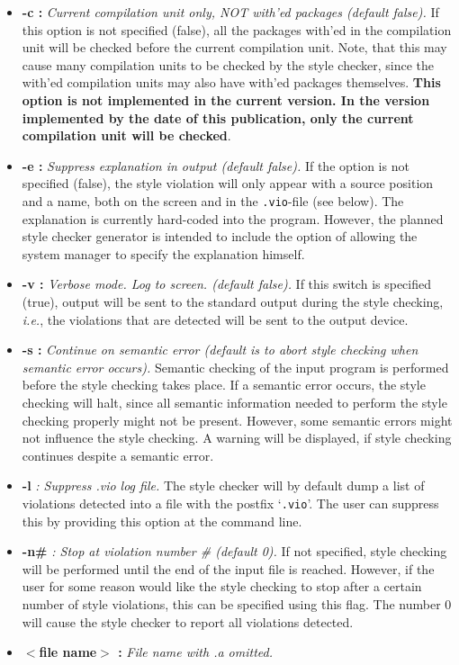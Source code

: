 \begin{itemize}
\item[] {\bf -c :} {\it Current compilation unit only, NOT with'ed packages (default
false).} If this option is not specified (false), all the packages with'ed in the
compilation unit will be checked before the current compilation unit. Note, that
this may cause many compilation units to be checked by the style checker, since the with'ed 
compilation units may also have with'ed packages themselves.
 {\bf This option is not 
implemented in the current version. In the version implemented by the date
of this publication, only the current
compilation unit will be checked}.
\item[] {\bf -e :} {\it Suppress explanation in output (default false).} 
If the option is not specified (false), the style violation will only
appear with a source position and a name, both on the screen and in the 
{\tt .vio}-file (see below). The explanation is currently hard-coded into the
program. However, the planned style checker generator is intended to include 
the option of allowing the system manager to specify the explanation himself.
\item[] {\bf -v :} {\it Verbose mode. Log to screen. (default false).} If this 
switch is specified (true), output will be sent to the standard output during the style
checking, {\em i.e.}, the violations that are detected will be sent to the output device. 
\item[] {\bf -s :} {\it Continue on semantic error (default is to abort style
checking when semantic error occurs).} Semantic checking
of the input program is performed before the style checking takes place. If a
semantic error occurs, the style checking will halt, since all semantic 
information needed to perform the style checking properly might not be present.
However, some semantic errors might not influence the style checking. A warning will be
displayed, if style checking continues despite a semantic error.
\item[] {\bf -l} {\it : Suppress .vio log file.} The style checker will
by default dump a list of violations detected into a file with the postfix `{\tt .vio}'. The user can suppress this by providing this option at the command line.
\item[] {\bf -n\#} {\it  : Stop at violation number \# (default 0).} If not specified, 
style checking will be performed until the end of the input file is reached. 
However, if the user for some reason would like the style checking to stop after
a certain number of style violations, this can be specified using this flag. 
The number 0 will cause the style checker to report all violations detected. 
\item[] {\bf $<$file name$>$ :} {\it File name with .a omitted.}
\end{itemize}

